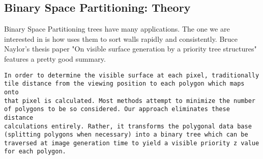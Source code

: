 \pagebreak

\subsection{Binary Space Partitioning: Theory} \label{Binary Space Partitioning: Theory}
Binary Space Partitioning trees have many applications. The one we are interested in is how \doom{}uses them to sort walls rapidly and consistently. Bruce Naylor's thesis paper "On visible surface generation by a priority tree structures" features a pretty good summary.\\

 \begin{verbatim}
In order to determine the visible surface at each pixel, traditionally
tile distance from the viewing position to each polygon which maps onto 
that pixel is calculated. Most methods attempt to minimize the number 
of polygons to be so considered. Our approach eliminates these distance
calculations entirely. Rather, it transforms the polygonal data base 
(splitting polygons when necessary) into a binary tree which can be 
traversed at image generation time to yield a visible priority z value
for each polygon.
\end{verbatim}

